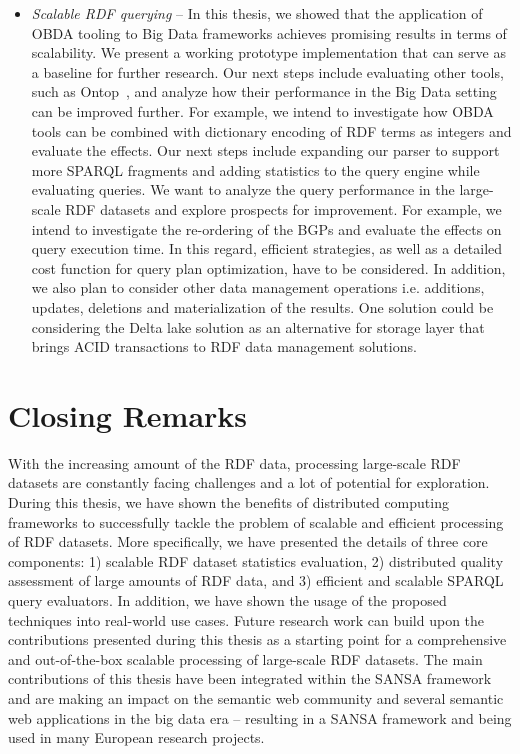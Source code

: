 \begin{itemize}
    \item \textit{Scalable \gls{RDF} querying} -- 
    In this thesis, we showed that the application of OBDA tooling to Big Data frameworks achieves promising results in terms of scalability. 
    We present a working prototype implementation that can serve as a baseline for further research. 
    Our next steps include evaluating other tools, such as Ontop~\cite{Calvanese2017OntopAS}, and analyze how their performance in the Big Data setting can be improved further. 
    For example, we intend to investigate how OBDA tools can be combined with dictionary encoding of \gls{RDF} terms as integers and evaluate the effects.
    Our next steps include expanding our parser to support more \gls{SPARQL} fragments and adding statistics to the query engine while evaluating queries. 
    We want to analyze the query performance in the large-scale \gls{RDF} datasets and explore prospects for improvement.
    For example, we intend to investigate the re-ordering of the \gls{BGP}s and evaluate the effects on query execution time.
    In this regard, efficient strategies, as well as a detailed cost function for query plan optimization, have to be considered.
    In addition, we also plan to consider other data management operations i.e. additions, updates, deletions and materialization of the results.
    One solution could be considering the Delta lake solution as an alternative for storage layer that brings ACID transactions to \gls{RDF} data management solutions.
\end{itemize}

\section{Closing Remarks}
With the increasing amount of the \gls{RDF} data, processing large-scale \gls{RDF} datasets are constantly facing challenges and a lot of potential for exploration.
During this thesis, we have shown the benefits of distributed computing frameworks to successfully tackle the problem of scalable and efficient processing of \gls{RDF} datasets.
More specifically, we have presented the details of three core components: 1) scalable \gls{RDF} dataset statistics evaluation, 2) distributed quality assessment of large amounts of \gls{RDF} data, and 3) efficient and scalable \gls{SPARQL} query evaluators.
In addition, we have shown the usage of the proposed techniques into real-world use cases.
Future research work can build upon the contributions presented during this thesis as a starting point for a comprehensive and out-of-the-box scalable processing of large-scale \gls{RDF} datasets.
The main contributions of this thesis have been integrated within the SANSA framework and are making an impact on the semantic web community and several semantic web applications in the big data era -- resulting in a SANSA framework and being used in many European research projects.


